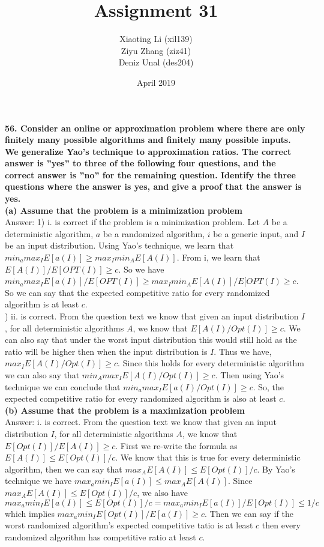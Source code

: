 \documentclass{article}
\title{Assignment 31}
\author{Xiaoting Li (xil139) \\
Ziyu Zhang (ziz41) \\
Deniz Unal (des204)}
\date{April 2019}
\begin{document}
\noindent
\textbf{56. Consider an online or approximation problem where there are only finitely many possible algorithms and finitely many possible inputs. We generalize Yao’s technique to approximation ratios. The correct answer is ”yes” to three of the following four questions, and the correct answer is ”no” for the remaining question. Identify the three questions where the answer is yes, and give a proof that the answer is yes.} \\ \newline
\textbf{(a) Assume that the problem is a minimization problem} \\ \newline
Answer: 1) i. is correct if the problem is a minimization problem. Let $A$ be a deterministic algorithm, $a$ be a randomized algorithm, $i$ be a generic input, and $I$ be an input distribution. Using Yao's technique, we learn that $min_a max_I E[a(I)] \geq max_I min_A E[A(I)]$. From i, we learn that $E[A(I)]/E[OPT(I)] \geq c$. So we have $min_a max_I E[a(I)]/E[OPT(I)] \geq max_I min_A E[A(I)]/E[OPT(I) \geq c$. So we can say that the expected competitive ratio for every randomized algorithm is at least $c$. \\ ) ii. is correct. From the question text we know that given an input distribution $I$, for all deterministic algorithms $A$, we know that $E[A(I) / Opt(I)] \geq c$. We can also say that under the worst input distribution this would still hold as the ratio will be higher then when the input distribution is $I$. Thus we have, $max_I E[A(I) / Opt(I)] \geq c$. Since this holds for every deterministic algorithm we can also say that $min_A max_I E[A(I) / Opt(I)] \geq c$. Then using Yao's technique we can conclude that $min_a max_I E[a(I) / Opt(I)] \geq c$. So, the expected competitive ratio for every randomized algorithm is also at least $c$. \\ \newline
\textbf{(b) Assume that the problem is a maximization problem} \\ \newline
Answer: i. is correct. From the question text we know that given an input distribution $I$, for all deterministic algorithms $A$, we know that $E[Opt(I)] / E[A(I)] \geq c$. First we re-write the formula as $E[A(I)] \leq E[Opt(I)] / c$. We know that this is true for every deterministic algorithm, then we can say that $max_A E[A(I)] \leq E[Opt(I)] / c$. By Yao's technique we have $max_a min_I E[a(I)] \leq max_A E[A(I)]$. Since $max_A E[A(I)] \leq E[Opt(I)] / c$, we also have $max_a min_I E[a(I)] \leq E[Opt(I)] / c = max_a min_I E[a(I)] / E[Opt(I)] \leq 1 / c$ which implies $max_a min_I E[Opt(I)] / E[a(I)] \geq c$. Then we can say if the worst randomized algorithm's expected competitive tatio is at least $c$ then every randomized algorithm has competitive ratio at least $c$. \\ \newline
\end{document}
